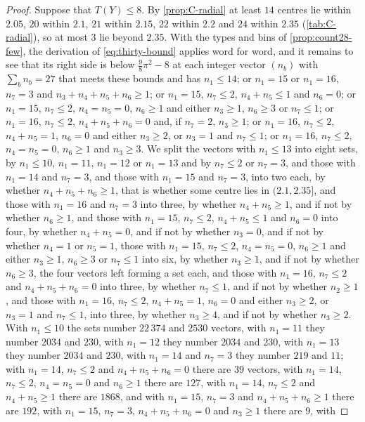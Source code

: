 \documentclass[11pt,reqno]{amsart}
\renewcommand{\_}{\origunderscore\allowbreak}
\numberwithin{equation}{section}
\theoremstyle{plain}
\theoremstyle{definition}
\theoremstyle{remark}
\begin{document}
\begin{proof}
Suppose that $T(Y)\le8$. By \cref{prop:C-radial} at least $14$ centres lie
within $2.05$, $20$ within $2.1$, $21$ within $2.15$, $22$ within $2.2$ and
$24$ within $2.35$ (\cref{tab:C-radial}), so at most $3$ lie beyond $2.35$.
With the types and bins of \cref{prop:count28-few}, the derivation of
\eqref{eq:thirty-bound} applies word for word, and it remains to see that its
right side is below $\frac98\pi^2-8$ at each integer vector $(n_b)$ with
$\sum_bn_b=27$ that meets these bounds and has $n_1\le14$; or $n_1=15$ or
$n_1=16$, $n_7=3$ and $n_3+n_4+n_5+n_6\ge1$; or $n_1=15$, $n_7\le2$,
$n_4+n_5\le1$ and $n_6=0$; or $n_1=15$, $n_7\le2$, $n_4=n_5=0$,
$n_6\ge1$ and either $n_3\ge1$, $n_6\ge3$ or $n_7\le1$; or $n_1=16$, $n_7\le2$, $n_4+n_5+n_6=0$ and,
if $n_7=2$, $n_3\ge1$; or $n_1=16$, $n_7\le2$,
$n_4+n_5=1$, $n_6=0$ and either $n_3\ge2$, or $n_3=1$ and $n_7\le1$; or $n_1=16$, $n_7\le2$, $n_4=n_5=0$,
$n_6\ge1$ and $n_3\ge3$. We split the vectors with $n_1\le13$ into eight sets, by
$n_1\le10$, $n_1=11$, $n_1=12$ or $n_1=13$ and by $n_7\le2$ or $n_7=3$,
and those with $n_1=14$ and $n_7=3$, and those with $n_1=15$ and $n_7=3$,
into two each, by whether $n_4+n_5+n_6\ge1$, that is whether some centre
lies in $(2.1,2.35]$, and those with $n_1=16$ and $n_7=3$ into three, by
whether $n_4+n_5\ge1$, and if not by whether $n_6\ge1$, and those with
$n_1=15$, $n_7\le2$, $n_4+n_5\le1$ and $n_6=0$ into four, by whether
$n_4+n_5=0$, and if not by whether $n_3=0$, and if not by whether $n_4=1$
or $n_5=1$, those with $n_1=15$, $n_7\le2$, $n_4=n_5=0$, $n_6\ge1$
and either $n_3\ge1$, $n_6\ge3$ or $n_7\le1$ into six, by whether $n_3\ge1$, and if not by whether $n_6\ge3$, the four vectors left forming a set each, and those with $n_1=16$, $n_7\le2$ and
$n_4+n_5+n_6=0$ into three, by whether $n_7\le1$, and if not by whether
$n_2\ge1$, and those with $n_1=16$,
$n_7\le2$, $n_4+n_5=1$, $n_6=0$ and either $n_3\ge2$, or $n_3=1$ and $n_7\le1$, into three, by whether
$n_3\ge4$, and if not by whether $n_3\ge2$. With
$n_1\le10$ the sets number $22\,374$ and $2530$ vectors, with $n_1=11$ they
number $2034$ and $230$, with $n_1=12$ they number $2034$ and $230$, with
$n_1=13$ they number $2034$ and $230$, with $n_1=14$ and $n_7=3$ they number
$219$ and $11$; with $n_1=14$, $n_7\le2$ and $n_4+n_5+n_6=0$ there are
$39$ vectors, with $n_1=14$, $n_7\le2$, $n_4=n_5=0$ and $n_6\ge1$ there
are $127$, with $n_1=14$, $n_7\le2$ and $n_4+n_5\ge1$ there are $1868$, and
with $n_1=15$, $n_7=3$ and $n_4+n_5+n_6\ge1$ there are $192$, with
$n_1=15$, $n_7=3$, $n_4+n_5+n_6=0$ and $n_3\ge1$ there are $9$, with

\end{proof}
\end{document}
